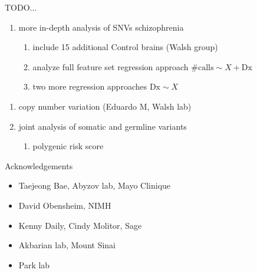 \documentclass[usenames,dvipsnames]{beamer}
\begin{document}
\begin{frame}{TODO...}
\begin{enumerate}
\item more in-depth analysis of SNVs schizophrenia
\begin{enumerate}
\item include 15 additional Control brains (Walsh group)
\item analyze full feature set regression approach \(\mathrm{\#calls} \sim X + \mathrm{Dx}\)
\item two more regression approaches \(\mathrm{Dx} \sim X\)
\end{enumerate}
\end{enumerate}
\begin{enumerate}
\item copy number variation (Eduardo M, Walsh lab)
\item joint analysis of somatic and germline variants
\begin{enumerate}
\item polygenic risk score
\end{enumerate}
\end{enumerate}
\end{frame}

\begin{frame}{Acknowledgements}
\begin{itemize}
\item Taejeong Bae, Abyzov lab, Mayo Clinique
\item David Obensheim, NIMH
\item Kenny Daily, Cindy Molitor, Sage
\item Akbarian lab, Mount Sinai
\item Park lab
\end{itemize}
\end{frame}
\end{document}
